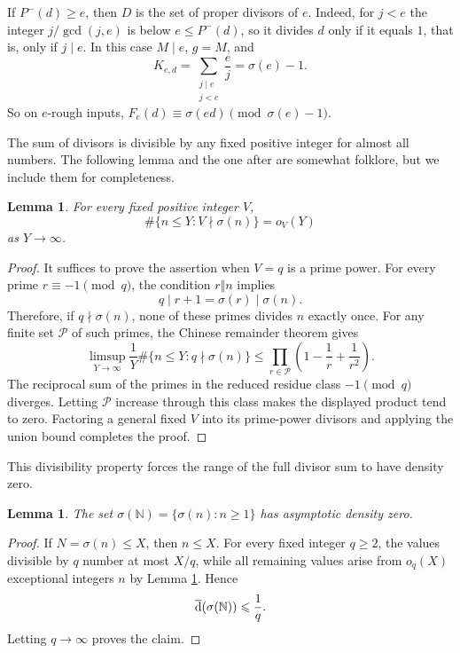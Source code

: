 \documentclass[11pt,letterpaper,reqno]{amsart}
\numberwithin{equation}{section}
\newtheorem{lemma}[theorem]{Lemma}
\theoremstyle{remark}
\newcommand{\N}{\mathbb{N}}
\newcommand{\upperdens}{\overline{\textup{d}}}
\renewcommand{\leq}{\leqslant}
\renewcommand{\geq}{\geqslant}
\begin{document}
If $P^-(d)\geq e$, then $D$ is the set of proper divisors of $e$.
Indeed, for $j<e$ the integer $j/\gcd(j,e)$ is below $e\leq P^-(d)$, so it
divides $d$ only if it equals $1$, that is, only if $j\mid e$. In this
case $M\mid e$, $g=M$, and
\[
 K_{e,d}=\sum_{\substack{j\mid e\\ j<e}}\frac ej=\sigma(e)-1 .
\]
So on $e$-rough inputs, $F_e(d)\equiv\sigma(ed)\pmod{\sigma(e)-1}$.

The sum of divisors is divisible by any fixed positive integer for almost all numbers.
The following lemma and the one after are somewhat folklore, but we include them for completeness.

\begin{lemma}
\label{lem:fixed-modulus-normality}
For every fixed positive integer $V$,
\[
 \#\{n\leq Y:V\nmid\sigma(n)\}=o_V(Y)
\]
as $Y\to\infty$.
\end{lemma}

\begin{proof}
It suffices to prove the assertion when $V=q$ is a prime power. For every
prime $r\equiv-1\pmod q$, the condition $r\Vert n$ implies
\[
 q\mid r+1=\sigma(r)\mid\sigma(n).
\]
Therefore, if $q\nmid\sigma(n)$, none of these primes divides $n$ exactly
once. For any finite set $\mathcal{P}$ of such primes, the Chinese remainder
theorem gives
\[
 \limsup_{Y\to\infty}\frac1Y
 \#\{n\leq Y:q\nmid\sigma(n)\}
 \leq\prod_{r\in\mathcal{P}}
 \left(1-\frac1r+\frac1{r^2}\right).
\]
The reciprocal sum of the primes in the reduced residue class
$-1\pmod q$ diverges. Letting $\mathcal{P}$ increase through this class makes
the displayed product tend to zero. Factoring a general fixed $V$ into its
prime-power divisors and applying the union bound completes the proof.
\end{proof}

This divisibility property forces the range of the full divisor sum to have density zero.

\begin{lemma}
\label{lem:sigma-range-zero}
The set $\sigma(\N)=\{\sigma(n):n\geq1\}$ has asymptotic density zero.
\end{lemma}

\begin{proof}
If $N=\sigma(n)\leq X$, then $n\leq X$. For every fixed integer $q\geq2$,
the values divisible by $q$ number at most $X/q$, while all remaining values
arise from $o_q(X)$ exceptional integers $n$ by
Lemma \ref{lem:fixed-modulus-normality}. Hence
\[
 \upperdens(\sigma(\N))\leq\frac1q.
\]
Letting $q\to\infty$ proves the claim.
\end{proof}
\end{document}
